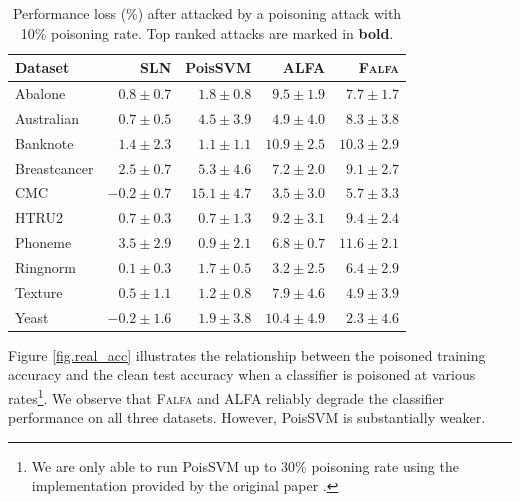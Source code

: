 \documentclass[runningheads]{llncs}
\newcommand{\falfa}{\textsc{Falfa}\xspace}
\begin{document}
\begin{table}[ht!]
    \footnotesize
    \centering
    \caption[Performance Loss Under Label Poisoning Attacks]{Performance loss (\%) after attacked by a poisoning attack with 10\% poisoning rate. Top ranked attacks are marked in \textbf{bold}.}
    \begin{tabular}{l|@{\hskip2pt}r@{\hskip2pt}|@{\hskip2pt}r@{\hskip2pt}|@{\hskip2pt}r@{\hskip2pt}|@{\hskip2pt}r@{\hskip2pt}}
        \toprule
        Dataset      & SLN          & PoisSVM               & ALFA                  & \falfa                \\
        \midrule
        Abalone      & $0.8\pm0.7$  & $1.8\pm0.8$           & $\mathbf{9.5\pm1.9}$  & $7.7\pm1.7$           \\
        Australian   & $0.7\pm0.5$  & $4.5\pm3.9$           & $\mathbf{4.9\pm4.0}$  & $\mathbf{8.3\pm3.8}$  \\
        Banknote     & $1.4\pm2.3$  & $1.1\pm1.1$           & $\mathbf{10.9\pm2.5}$ & $\mathbf{10.3\pm2.9}$ \\
        Breastcancer & $2.5\pm0.7$  & $5.3\pm4.6$           & $\mathbf{7.2\pm2.0}$  & $\mathbf{9.1\pm2.7}$  \\
        CMC          & $-0.2\pm0.7$ & $\mathbf{15.1\pm4.7}$ & $3.5\pm3.0$           & $5.7\pm3.3$           \\
        HTRU2        & $0.7\pm0.3$  & $0.7\pm1.3$           & $\mathbf{9.2\pm3.1}$  & $\mathbf{9.4\pm2.4}$  \\
        Phoneme      & $3.5\pm2.9$  & $0.9\pm2.1$           & $6.8\pm0.7$           & $\mathbf{11.6\pm2.1}$ \\
        Ringnorm     & $0.1\pm0.3$  & $1.7\pm0.5$           & $3.2\pm2.5$           & $\mathbf{6.4\pm2.9}$  \\
        Texture      & $0.5\pm1.1$  & $1.2\pm0.8$           & $\mathbf{7.9\pm4.6}$  & $\mathbf{4.9\pm3.9}$  \\
        Yeast        & $-0.2\pm1.6$ & $1.9\pm3.8$           & $\mathbf{10.4\pm4.9}$ & $2.3\pm4.6$           \\
        \bottomrule
    \end{tabular}
    \label{tab.err10}
\end{table}


Figure \ref{fig.real_acc} illustrates the relationship between the poisoned training accuracy and the clean test accuracy when a classifier is poisoned at various rates\footnote{We are only able to run PoisSVM up to 30\% poisoning rate using the implementation provided by the original paper \cite{biggio2012poisoning}.}.
We observe that \falfa and ALFA reliably degrade the classifier performance on all three datasets. However, PoisSVM is substantially weaker.
\end{document}

